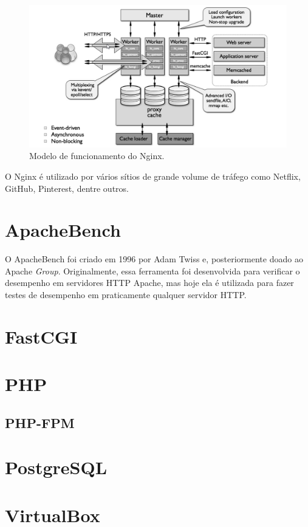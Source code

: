 \begin{figure}
\centering
\includegraphics[scale=1]{figuras/nginx-how-it-works} 
\caption{Modelo de funcionamento do Nginx.}
\label{fig:nginx-comofunciona}
\end{figure}

O Nginx é utilizado por vários sítios de grande volume de tráfego como Netflix, GitHub, Pinterest, dentre outros.\\

\section{ApacheBench}
O ApacheBench foi criado em 1996 por Adam Twiss e, posteriormente doado ao Apache \textit{Group}. Originalmente, essa ferramenta foi desenvolvida para verificar o desempenho em servidores HTTP Apache, mas hoje ela é utilizada para fazer testes de desempenho em  praticamente qualquer servidor HTTP.

\section{FastCGI}

\section{PHP}
\subsection{PHP-FPM}

\section{PostgreSQL}

\section{VirtualBox}

